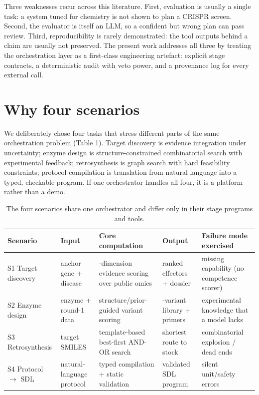 Three weaknesses recur across this literature. First, evaluation is usually a single task: a system tuned for chemistry is not shown to plan a CRISPR screen. Second, the evaluator is itself an LLM, so a confident but wrong plan can pass review. Third, reproducibility is rarely demonstrated: the tool outputs behind a claim are usually not preserved. The present work addresses all three by treating the orchestration layer as a first-class engineering artefact: explicit stage contracts, a deterministic audit with veto power, and a provenance log for every external call.

\section{Why four scenarios}

We deliberately chose four tasks that stress different parts of the same orchestration problem (Table 1). Target discovery is evidence integration under uncertainty; enzyme design is structure-constrained combinatorial search with experimental feedback; retrosynthesis is graph search with hard feasibility constraints; protocol compilation is translation from natural language into a typed, checkable program. If one orchestrator handles all four, it is a platform rather than a demo.

\begin{table}[htbp]
\centering
\small
\caption{The four scenarios share one orchestrator and differ only in their stage programs and tools.}
\begin{tabularx}{\textwidth}{l>{\raggedright\arraybackslash}X>{\raggedright\arraybackslash}X>{\raggedright\arraybackslash}X>{\raggedright\arraybackslash}X}
\hline
Scenario & Input & Core computation & Output & Failure mode exercised \\
\hline
S1 Target discovery & anchor gene + disease & 6-dimension evidence scoring over public omics & ranked effectors + dossier & missing capability (no competence scorer) \\
S2 Enzyme design & enzyme + round-1 data & structure/prior-guided variant scoring & 15-variant library + primers & experimental knowledge that a model lacks \\
S3 Retrosynthesis & target SMILES & template-based best-first AND-OR search & shortest route to stock & combinatorial explosion / dead ends \\
S4 Protocol $\rightarrow$ SDL & natural-language protocol & typed compilation + static validation & validated SDL program & silent unit/safety errors \\
\hline
\end{tabularx}

\end{table}

